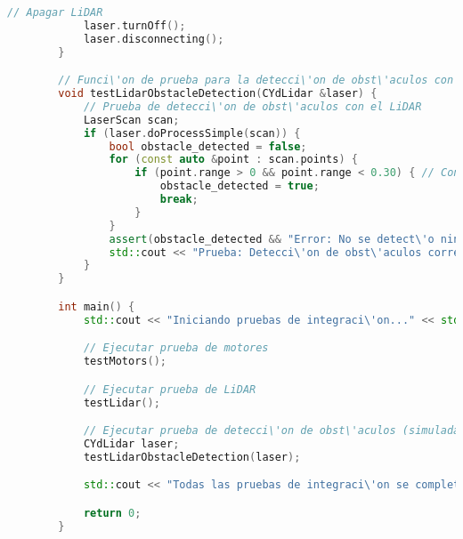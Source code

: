 \begin{lstlisting}[language={C++}, caption={C\'odigo de pruebas de integraci\'organismo}, label={swsa}]
            // Apagar LiDAR
            laser.turnOff();
            laser.disconnecting();
        }

        // Funci\'on de prueba para la detecci\'on de obst\'aculos con LiDAR
        void testLidarObstacleDetection(CYdLidar &laser) {
            // Prueba de detecci\'on de obst\'aculos con el LiDAR
            LaserScan scan;
            if (laser.doProcessSimple(scan)) {
                bool obstacle_detected = false;
                for (const auto &point : scan.points) {
                    if (point.range > 0 && point.range < 0.30) { // Condici\'on de obst\'aculo
                        obstacle_detected = true;
                        break;
                    }
                }
                assert(obstacle_detected && "Error: No se detect\'o ning\'un obst\'aculo cuando se esperaba.");
                std::cout << "Prueba: Detecci\'on de obst\'aculos correcta." << std::endl;
            }
        }

        int main() {
            std::cout << "Iniciando pruebas de integraci\'on..." << std::endl;

            // Ejecutar prueba de motores
            testMotors();

            // Ejecutar prueba de LiDAR
            testLidar();

            // Ejecutar prueba de detecci\'on de obst\'aculos (simulada)
            CYdLidar laser;
            testLidarObstacleDetection(laser);

            std::cout << "Todas las pruebas de integraci\'on se completaron correctamente." << std::endl;

            return 0;
        }


    \end{lstlisting}
    \vskip 0.5cm
